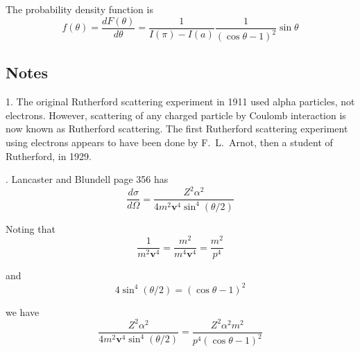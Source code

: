 The probability density function is
\begin{equation*}
f(\theta)=\frac{dF(\theta)}{d\theta}=\frac{1}{I(\pi)-I(a)}\frac{1}{(\cos\theta-1)^2}\sin\theta
\end{equation*}

\subsection*{Notes}
1. The original Rutherford scattering experiment in 1911 used alpha particles, not electrons.
However, scattering of any charged particle by Coulomb interaction
is now known as Rutherford scattering.
The first Rutherford scattering experiment using electrons appears to have
been done by F.~L.~Arnot, then a student of Rutherford, in 1929.

. Lancaster and Blundell page 356 has
\begin{equation*}
\frac{d\sigma}{d\Omega}
=\frac{Z^2\alpha^2}{4m^2\mathbf v^4\sin^4(\theta/2)}
\end{equation*}

Noting that
\begin{equation*}
\frac{1}{m^2\mathbf v^4}=\frac{m^2}{m^4\mathbf v^4}=\frac{m^2}{p^4}
\end{equation*}

and
\begin{equation*}
4\sin^4(\theta/2)=(\cos\theta-1)^2
\end{equation*}

we have
\begin{equation*}
\frac{Z^2\alpha^2}{4m^2\mathbf v^4\sin^4(\theta/2)}
=\frac{Z^2\alpha^2m^2}{p^4(\cos\theta-1)^2}
\end{equation*}


